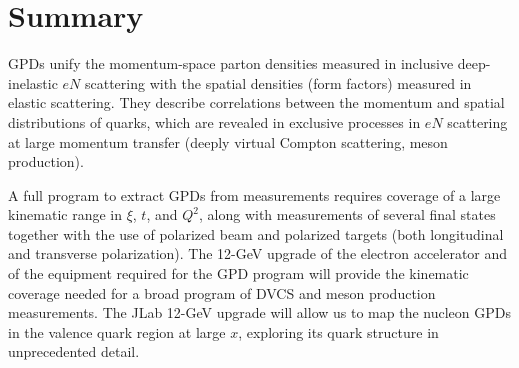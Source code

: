 \section{Summary}

GPDs unify the momentum-space parton densities measured in inclusive 
deep-inelastic $eN$ scattering with the spatial densities (form factors) 
measured in elastic scattering.  They describe correlations between the 
momentum and spatial distributions of quarks, which are revealed in 
exclusive processes in $eN$ scattering at large momentum transfer (deeply 
virtual Compton scattering, meson production).

A full program to extract GPDs from measurements requires coverage of a 
large kinematic range in $\xi$, $t$, and $Q^2$, along with measurements of 
several final states together with the use of polarized beam and polarized 
targets (both longitudinal and transverse polarization).  The 12-GeV upgrade 
of the electron accelerator and of the equipment required for the GPD program 
will provide the kinematic coverage needed for a broad program of DVCS and 
meson production measurements.  The JLab 12-GeV upgrade will allow us to map 
the nucleon GPDs in the valence quark region at large $x$, exploring its quark 
structure in unprecedented detail.

